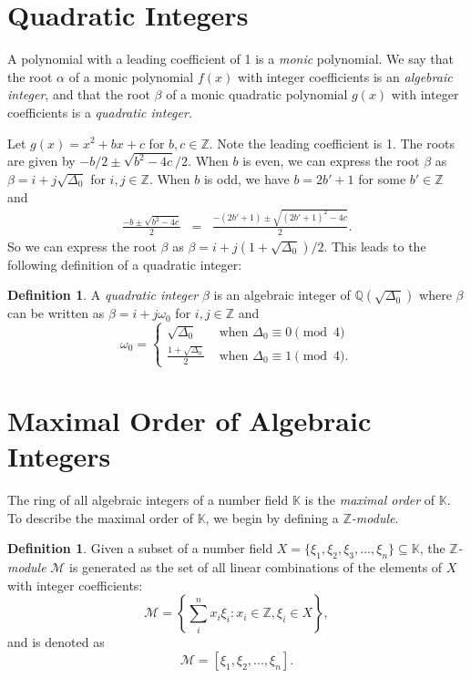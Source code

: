 \documentclass{ucalgthes1}
\theoremstyle{plain}
\theoremstyle{definition}
\newtheorem{defn}[thm]{Definition}
\newcommand{\KK}{\mathbb{K}}
\newcommand{\MM}{\mathcal{M}}
\newcommand{\ZZ}{\mathbb{Z}}
\newcommand{\QQ}{\mathbb{Q}}
\begin{document}
\bigbreak
\section{Quadratic Integers}

A polynomial with a leading coefficient of 1 is a \emph{monic} polynomial. We say that the root $\alpha$ of a monic polynomial $f(x)$ with integer coefficients is an \emph{algebraic integer}, and that the root $\beta$ of a monic quadratic polynomial $g(x)$ with integer coefficients is a \emph{quadratic integer}.

Let $g(x) = x^2 + bx + c$ for $b, c \in \ZZ$.  Note the leading coefficient is 1.  The roots are given by $-b/2 \pm \sqrt{b^2-4c}/2$. When $b$ is even, we can express the root $\beta$ as $\beta = i + j \sqrt{\Delta_0}$ for $i,j \in \ZZ$.  When $b$ is odd, we have $b = 2b' + 1$ for some $b' \in \ZZ$ and
\begin{eqnarray*}
\frac{-b \pm \sqrt{b^2-4c}}{2} & = & \frac{-(2b'+1) \pm \sqrt{(2b'+1)^2 - 4c}}{2}.
\end{eqnarray*}
So we can express the root $\beta$ as $\beta = i + j(1 + \sqrt{\Delta_0})/2$.  This leads to the following definition of a quadratic integer:

\begin{defn}
\label{defn:quadraticInteger}
A \emph{quadratic integer} $\beta$ is an algebraic integer of $\QQ(\sqrt{\Delta_0})$ where $\beta$ can be written as $\beta = i + j \omega_0$ for $i,j \in \ZZ$ and
\begin{equation*}
	\omega_0 = \begin{cases}
		\sqrt{\Delta_0} & \textrm{ when } \Delta_0 \equiv 0 \pmod 4 \\
		\frac{1+\sqrt{\Delta_0}}{2} & \textrm{ when } \Delta_0 \equiv 1 \pmod 4.
	\end{cases}
\end{equation*}
\end{defn}


\bigbreak
\section{Maximal Order of Algebraic Integers}
The ring of all algebraic integers of a number field $\KK$ is the \emph{maximal order} of $\KK$.  To describe the maximal order of $\KK$, we begin by defining a \emph{$\ZZ$-module}.  

\begin{defn}
Given a subset of a number field $X = \{ \xi_1, \xi_2, \xi_3, ..., \xi_n \} \subseteq \KK$, the \emph{$\ZZ$-module} $\MM$ is generated as the set of all linear combinations of the elements of $X$ with integer coefficients:
\[
	\MM = \left \{ \sum_{i}^n x_i \xi_i : x_i \in \ZZ, \xi_i \in X \right \},
\]
and is denoted as
\[
	\MM = [ \xi_1, \xi_2, ..., \xi_n ].
\]
\end{defn}
\end{document}
